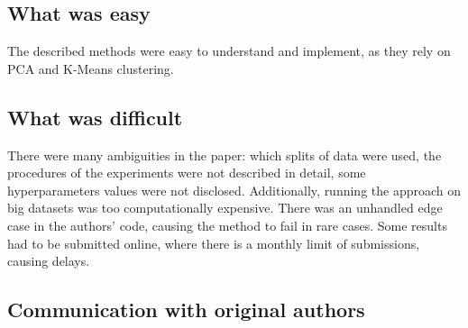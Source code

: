 
\subsection*{What was easy}

The described methods were easy to understand and implement, as they rely on PCA and K-Means clustering.

\subsection*{What was difficult}

There were many ambiguities in the paper: which splits of data were used, the procedures of the experiments were not described in detail, some hyperparameters values were not disclosed. Additionally, running the approach on big datasets was too computationally expensive. There was an unhandled edge case in the authors' code, causing the method to fail in rare cases. Some results had to be submitted online, where there is a monthly limit of submissions, causing delays.

\subsection*{Communication with original authors}

